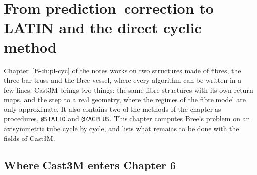 \chapter{From prediction--correction to LATIN and the direct cyclic method}\label{cc:ch6}


Chapter~\ref{B-ch:pl-cyc} of the notes works on two structures made of
fibres, the three-bar truss and the Bree vessel, where every algorithm can
be written in a few lines. Cast3M brings two things: the same fibre structures
with its own return maps, and the step to a real geometry, where the regimes of
the fibre model are only approximate. It also contains two of the methods of
the chapter as procedures, \texttt{@STATIO} and \texttt{@ZACPLUS}. This chapter
computes Bree's problem on an axisymmetric tube cycle by cycle, and lists what
remains to be done with the fields of Cast3M.

\section{Where Cast3M enters Chapter 6}\label{cc:sec6-map}
%

